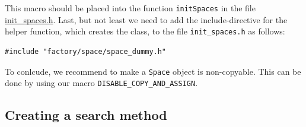 \documentclass[runningheads,a4paper]{llncs}
\newcommand{\replocfile}{https://github.com/searchivarius/NonMetricSpaceLib/blob/pserv/}
\newcommand{\ttt}[1]{\texttt{#1}}
\begin{document}
This macro should be placed into the function \ttt{initSpaces} in the 
file 
\href{\replocfile similarity_search/include/factory/init\_spaces.h}{init\_spaces.h}.
Last, but not least we need to add the include-directive
for the helper function, which creates
the class, to the file \ttt{init\_spaces.h} as follows:
\begin{verbatim}
#include "factory/space/space_dummy.h"
\end{verbatim}

To conlcude, we recommend to make a \ttt{Space} object is non-copyable. 
This can be done by using our macro \ttt{DISABLE\_COPY\_AND\_ASSIGN}.


\subsection{Creating a search method}\label{SectionCreateMethod}
\end{document}
